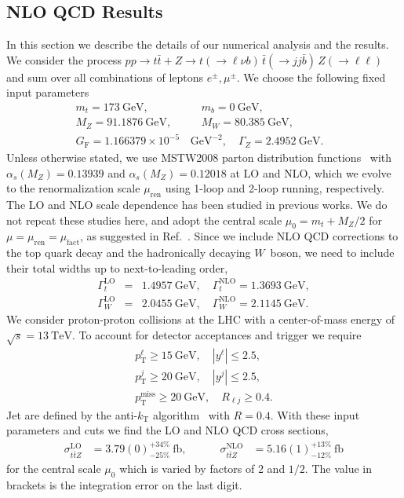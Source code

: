 \documentclass{JHEP3}
\newcommand{\GeV}{\mathrm{GeV}}
\newcommand{\TeV}{\mathrm{TeV}}
\newcommand{\pT}{p_{\mathrm{T}}}
\def\ttb{t\bar{t}}
\newcommand{\be}{\begin{eqnarray}}
\newcommand{\ee}{\end{eqnarray}}
\begin{document}
\subsection{NLO QCD Results}
\label{sec:NLOres}
In this section we describe the details of our numerical analysis and the results.
We consider the process 
$pp \to \ttb + Z \to t(\to \ell \nu b) \, \bar{t} (\to jj \bar{b}) \, Z(\to \ell \ell)$
and sum over all combinations of leptons $e^\pm, \mu^\pm$.
We choose the following fixed input parameters
\be
  m_t = 173~\GeV,& \quad   m_b = 0~\GeV,&
  \nonumber\\
  M_Z =91.1876~\GeV,& \quad  M_W =80.385~\GeV,&
  \nonumber\\
  G_\mathrm{F} = 1.166379 \times 10^{-5} \,& \GeV^{-2},  \quad \Gamma_Z = 2.4952~\GeV.&
\ee
Unless otherwise stated, we use MSTW2008 parton distribution functions~\cite{Martin:2009iq} with 
$\alpha_s(M_Z)=0.13939$ and $\alpha_s(M_Z)=0.12018$ at LO and NLO, which we
evolve to the renormalization scale $\mu_\mathrm{ren}$ using 1-loop and 2-loop running, respectively.
The LO and NLO scale dependence has been studied in previous works. 
We do not repeat these studies here, and adopt the central scale $\mu_0=m_t + M_Z/2$ for $\mu=\mu_\mathrm{ren}=\mu_\mathrm{fact}$, as suggested in Ref.~\cite{Lazopoulos:2008de}.
Since we include NLO QCD corrections to the top quark decay and the hadronically decaying $W$~boson, we need to 
include their total widths up to next-to-leading order,
\be
  \Gamma_t^\mathrm{LO} &=& 1.4957~\GeV, \quad \Gamma_t^\mathrm{NLO} = 1.3693~\GeV,
  \nonumber\\
  \Gamma_W^\mathrm{LO} &=& 2.0455~\GeV, \quad \Gamma_W^\mathrm{NLO} = 2.1145~\GeV.
\ee
We consider proton-proton collisions at the LHC with a center-of-mass energy of $\sqrt{s}=13~\TeV$.
To account for detector acceptances and trigger we require
\be
  \label{selectioncuts}
  \pT^{\ell} \ge 15~\GeV, \quad |y^{\ell}| \le 2.5,
  \nonumber\\
  \pT^{j} \ge 20~\GeV, \quad |y^{j}| \le 2.5,
  \nonumber\\
  \pT^{\mathrm{miss}} \ge 20~\GeV, \quad R_{\ell j} \ge 0.4.
\ee
Jet are defined by the anti-$k_\mathrm{T}$ algorithm~\cite{Cacciari:2008gp} with $R=0.4$.
With these input parameters and cuts we find the LO and NLO QCD cross sections,
\be
  \label{XsecNum}
  \sigma_{\ttb Z}^\mathrm{LO} &= 3.79(0)^{+34\%}_{-25\%}~\mathrm{fb},
  \quad\quad\quad
  \sigma_{\ttb Z}^\mathrm{NLO} &= 5.16(1)^{+13\%}_{-12\%}~\mathrm{fb}
\ee
for the central scale $\mu_0$ which is varied by factors of 2 and $1/2$. The value in brackets is the integration error on the last digit.
\end{document}
